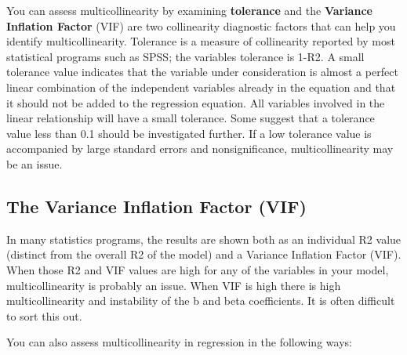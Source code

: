 \documentclass[]{report}
\begin{document}
     You can assess multicollinearity by examining \textbf{tolerance} and the \textbf{Variance Inflation Factor} (VIF) are two collinearity diagnostic factors that can help you identify multicollinearity. Tolerance is a measure of collinearity reported by most statistical programs such as SPSS; the variables tolerance is 1-R2. A small tolerance value indicates that the variable under consideration is almost a perfect linear combination of the independent variables already in the equation and that it should not be added to the regression equation. All variables involved in the linear relationship will have a small tolerance. Some suggest that a tolerance value less than 0.1 should be investigated further. If a low tolerance value is accompanied by large standard errors and nonsignificance, multicollinearity may be an issue.


\subsection{The Variance Inflation Factor (VIF)}



   In many statistics programs, the results are shown both as an individual R2 value (distinct from the overall R2 of the model) and a Variance Inflation Factor (VIF). When those R2 and VIF values are high for any of the variables in your model, multicollinearity is probably an issue. When VIF is high there is high multicollinearity and instability of the b and beta coefficients. It is often difficult to sort this out. \\

\bigskip

You can also assess multicollinearity in regression in the following ways:
\end{document}
